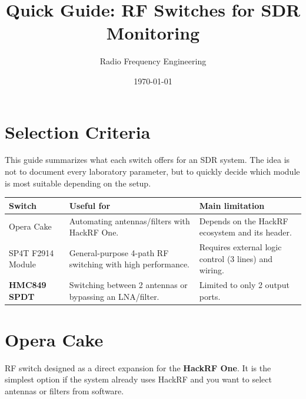 \documentclass[11pt]{article}
\title{Quick Guide: RF Switches for SDR Monitoring}
\author{Radio Frequency Engineering}
\date{\today}
\begin{document}
\maketitle
\tableofcontents
\newpage

\section{Selection Criteria}

This guide summarizes what each switch offers for an SDR system. The idea is not to document every laboratory parameter, but to quickly decide which module is most suitable depending on the setup.

\begin{table}[h]
    \centering
    \small
    \begin{tabular}{p{}p{}p{}}
        \toprule
        \textbf{Switch} & \textbf{Useful for} & \textbf{Main limitation} \\
        \midrule
        Opera Cake & Automating antennas/filters with HackRF One. & Depends on the HackRF ecosystem and its header. \\
        SP4T F2914 Module & General-purpose 4-path RF switching with high performance. & Requires external logic control (3 lines) and wiring. \\
        \textbf{HMC849 SPDT} & Switching between 2 antennas or bypassing an LNA/filter. & Limited to only 2 output ports. \\
        \bottomrule
    \end{tabular}
\end{table}

\section{Opera Cake}

RF switch designed as a direct expansion for the \textbf{HackRF One}. It is the simplest option if the system already uses HackRF and you want to select antennas or filters from software.
\end{document}
